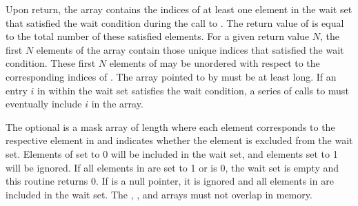 \begin{apidefinition}
{    Upon return, the  array contains the indices of at least one
    element in the wait set that satisfied the wait condition during the call
    to .  The return value of
     is equal to the total
    number of these satisfied elements.  For a given return value $N$, the
    first $N$ elements of the  array contain those unique indices
    that satisfied the wait condition.  These first $N$ elements of
     may be unordered with respect to the corresponding indices of
    .  The array pointed to by  must be at least
     long.  If an entry $i$ in  within the wait set
    satisfies the wait condition, a series of calls to
     must eventually include
    $i$ in the  array.

    The optional  is a mask array of length  where each
    element corresponds to the respective element in  and indicates
    whether the element is excluded from the wait set.  Elements of
     set to 0 will be included in the wait set, and elements set to
    1 will be ignored.  If all elements in  are set to 1 or
     is 0, the wait set is empty and this routine returns 0.
    If  is a null pointer, it is ignored
    and all elements in  are included in the wait set.  The
    , , and  arrays must not overlap in
    memory.
}






\end{apidefinition}
